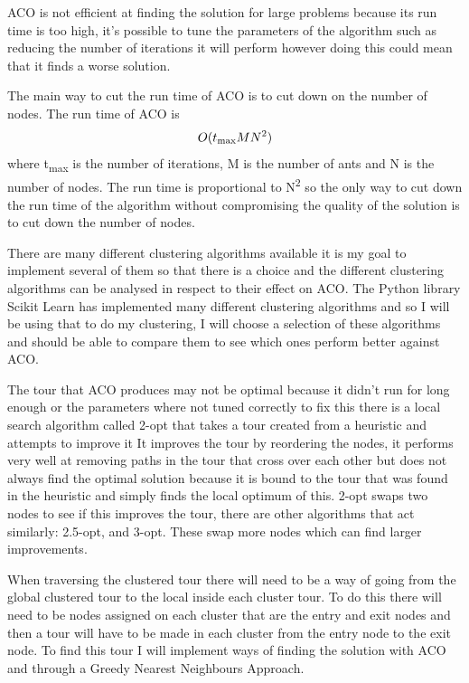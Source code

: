 ACO is not efficient at finding the solution for large problems because its run time is too high, it's possible to tune the parameters of the algorithm such as reducing the number of iterations it will perform however doing this could mean that it finds a worse solution. 

The main way to cut the run time of ACO is to cut down on the number of nodes. The run time of ACO is \[O(t\textsubscript{max}MN^2)\] where t\textsubscript{max} is the number of iterations, M is the number of ants and N is the number of nodes\cite{pang_chao-yang_ben-qiong_zhang_jie_wei_shan_zheng-chao_2014}. The run time is proportional to N\textsuperscript{2} so the only way to cut down the run time of the algorithm without compromising the quality of the solution is to cut down the number of nodes.

There are many different clustering algorithms available it is my goal to implement several of them so that there is a choice and the different clustering algorithms can be analysed in respect to their effect on ACO. The Python library Scikit Learn\cite{scikit_learn_python_library} has implemented many different clustering algorithms\cite{scikit_clustering} and so I will be using that to do my clustering, I will choose a selection of these algorithms and should be able to compare them to see which ones perform better against ACO.

The tour that ACO produces may not be optimal because it didn't run for long enough or the parameters where not tuned correctly to fix this there is a local search algorithm called 2-opt that takes a tour created from a heuristic and attempts to improve it\cite{venhuis_2019} It improves the tour by reordering the nodes, it performs very well at removing paths in the tour that cross over each other but does not always find the optimal solution because it is bound to the tour that was found in the heuristic and simply finds the local optimum of this. 2-opt swaps two nodes to see if this improves the tour, there are other algorithms that act similarly: 2.5-opt, and 3-opt. These swap more nodes which can find larger improvements.

When traversing the clustered tour there will need to be a way of going from the global clustered tour to the local inside each cluster tour. To do this there will need to be nodes assigned on each cluster that are the entry and exit nodes and then a tour will have to be made in each cluster from the entry node to the exit node. To find this tour I will implement ways of finding the solution with ACO and through a Greedy Nearest Neighbours Approach.

